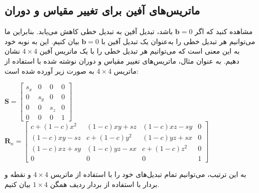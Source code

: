 \subsection{\textbf{ماتریس‌های آفین برای تغییر مقیاس و دوران}}
\label{subsec:3.2.4}
{
    \Large
    \begin{spacing}{1.5}
        مشاهده کنید که اگر $\textbf{b}=0$ باشد، تبدیل آفین به تبدیل خطی کاهش می‌یابد.
        بنابراین ما می‌توانیم هر تبدیل خطی را به‌عنوان یک تبدیل آفین با $\textbf{b}=0$ بیان کنیم.
        این به نوبه خود به این معنی است که می‌توانیم هر تبدیل خطی را با یک ماتریس آفین $4\times 4$ نشان دهیم.
        به عنوان مثال، ماتریس‌های تغییر مقیاس و دوران نوشته شده با استفاده از ماتریس $4\times 4$ به صورت زیر آورده شده است:

        \begin{center}
            $\textbf{S}=\begin{bmatrix}
                            s_x & 0   & 0   & 0 \\
                            0   & s_y & 0   & 0 \\
                            0   & 0   & s_z & 0 \\
                            0   & 0   & 0   & 1
            \end{bmatrix}$ \\
            $\textbf{R}_{n}=\begin{bmatrix}
                                c+(1-c)x^{2} & (1-c)xy+sz   & (1-c)xz-sy   & 0 \\
                                (1-c)xy-sz   & c+(1-c)y^{2} & (1-c)yz+sx   & 0 \\
                                (1-c)xz+sy   & (1-c)yz-sx   & c+(1-c)z^{2} & 0 \\
                                0            & 0            & 0            & 1
            \end{bmatrix}$
        \end{center}

        به این ترتیب، می‌توانیم تمام تبدیل‌های خود را با استفاده از ماتریس $4\times 4$ و نقطه و بردار با استفاده از بردار ردیف همگن $1\times 4$ بیان کنیم.
    \end{spacing}
}


